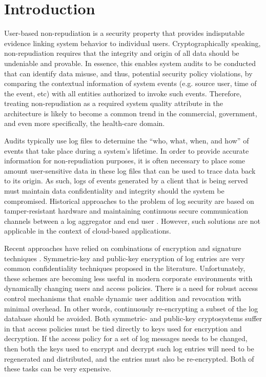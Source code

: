 \documentclass{sig-alternate}
\begin{document}
\section{Introduction}
User-based non-repudiation is a security property that provides indisputable evidence linking
system behavior to individual users. Cryptographically speaking, 
non-repudiation requires that the integrity and 
origin of all data should be undeniable and provable. In essence, this enables system audits to be conducted that can
identify data misuse, and thus, potential security policy violations, by comparing the contextual information 
of system events (e.g. source user, time of the event, etc) with all entities authorized to invoke such events. 
Therefore, treating non-repudiation as a required system quality attribute in the architecture is likely to 
become a common trend in the commercial, government, and even more specifically, the health-care domain.

Audits typically use log files to determine the ``who, what, when, and how'' of events that take 
place during a system's lifetime. In order to provide accurate information for non-repudiation purposes,
it is often necessary to place some amount user-sensitive data in these log files that can be used
to trace data back to its origin. As such, logs of events generated by a client that is being served must
maintain data confidentiality and integrity should the system be compromised. Historical approaches
to the problem of log security are based on tamper-resistant hardware and maintaining continuous 
secure communication channels between a log aggregator and end user \cite{Schneier1999-Secure}. 
However, such solutions are not applicable in the context of cloud-based applications. 

Recent approaches have relied on combinations of encryption and signature techniques \cite{Ma2008-FssAgg}. 
Symmetric-key and public-key encryption of log entries are very common confidentiality techniques 
proposed in the literature. Unfortunately, these schemes are becoming less useful in modern corporate environments with
dynamically changing users and access policies.
There is a need for robust access control mechanisms that enable dynamic user addition and revocation
with minimal overhead. In other words, continuously re-encrypting a subset of the log database should be avoided. 
Both symmetric- and public-key cryptosystems suffer in that access policies must be tied directly to keys used for
encryption and decryption. If the access policy for a set of log messages needs to be changed, then both the keys used to
encrypt and decrypt such log entries will need to be regenerated and distributed, and the entries must also
be re-encrypted. Both of these tasks can be very expensive. 
\end{document}
